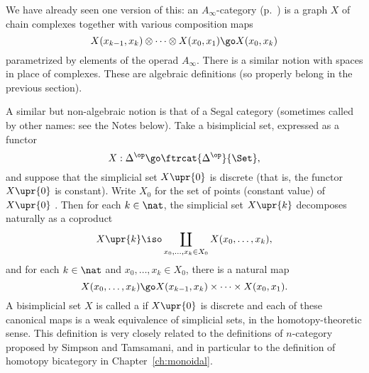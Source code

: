 We have already seen one version of this: an $A_\infty$-category%
%
%
(p.~\pageref{p:A-infty-category}) is a graph $X$ of chain complexes together
with various composition maps
\[
X(x_{k-1}, x_k) \otimes \cdots \otimes X(x_0, x_1)
\go
X(x_0, x_k)
\]
parametrized by elements of the operad $A_\infty$.  There is a similar
notion with spaces in place of complexes.  These are algebraic definitions
(so properly belong in the previous section).

A similar but non-algebraic notion is that of a Segal
category (sometimes
called by other names: see the Notes below).  Take a bisimplicial%
%
%
%
%
set,
expressed as a functor
\[
X: \Delta^\op \go \ftrcat{\Delta^\op}{\Set},
\]
and suppose that the simplicial set $X\upr{0}$ is discrete (that is, the
functor $X\upr{0}$ is constant).  Write $X_0$ for the set of points
(constant value) of $X\upr{0}$ .  Then for each $k\in\nat$, the simplicial
set $X\upr{k}$ decomposes naturally as a coproduct
\[
 X\upr{k} 
\iso 
\coprod_{x_0, \ldots, x_k \in X_0} 
X(x_0, \ldots, x_k),
\]
and for each $k\in\nat$ and $x_0, \ldots, x_k \in X_0$, there is a natural
map
\[
X(x_0, \ldots, x_k)
\go
X(x_{k-1}, x_k) \times \cdots \times X(x_0, x_1).
\]
A bisimplicial set $X$ is called a  if $X\upr{0}$ is
discrete and each of these canonical maps is a weak equivalence of
simplicial sets, in the homotopy-theoretic sense.  This definition is very
closely related to the definitions of $n$-category proposed by Simpson%
%
%
%
%
and
Tamsamani,%
%
%
%
%
%
 and in particular to the definition of homotopy%
%
%
bicategory in
Chapter~\ref{ch:monoidal}.

